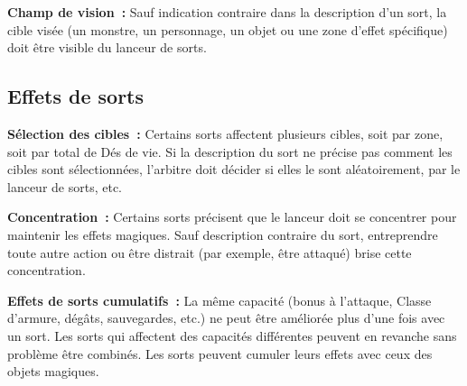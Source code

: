 \textbf{Champ de vision~:} Sauf indication contraire dans la description
d'un sort, la cible visée (un monstre, un personnage, un objet ou une
zone d'effet spécifique) doit être visible du lanceur de sorts.

\subsection{Effets de sorts}\label{effets-de-sorts}

\textbf{Sélection des cibles~:} Certains sorts affectent plusieurs
cibles, soit par zone, soit par total de Dés de vie. Si la description
du sort ne précise pas comment les cibles sont sélectionnées, l'arbitre
doit décider si elles le sont aléatoirement, par le lanceur de sorts,
etc.

\textbf{Concentration~:} Certains sorts précisent que le lanceur doit se
concentrer pour maintenir les effets magiques. Sauf description
contraire du sort, entreprendre toute autre action ou être distrait (par
exemple, être attaqué) brise cette concentration.

\textbf{Effets de sorts cumulatifs~:}  La même capacité (bonus à l'attaque, Classe d'armure, dégâts,
sauvegardes, etc.) ne peut être améliorée plus d'une fois avec un sort.
Les sorts qui affectent des capacités différentes peuvent en revanche sans problème être combinés.
Les sorts peuvent cumuler leurs effets avec ceux des objets magiques.


